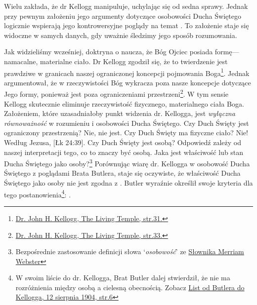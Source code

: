 Wielu zakłada, że dr Kellogg manipuluje, uchylając się od sedna sprawy. Jednak przy pewnym założeniu jego argumenty dotyczące osobowości Ducha Świętego logicznie wspierają jego kontrowersyjne poglądy na temat . To założenie staje się widoczne w samych danych, gdy uważnie śledzimy jego sposób rozumowania.

Jak widzieliśmy wcześniej, doktryna o  naucza, że Bóg Ojciec posiada formę—namacalne, materialne ciało. Dr Kellogg zgodził się, że to twierdzenie jest prawdziwe w granicach naszej ograniczonej koncepcji pojmowania Boga\footnote{\href{https://archive.org/details/J.H.Kellogg.TheLivingTemple1903/page/n33/}{Dr. John H. Kellogg, The Living Temple, str.31.}}. Jednak argumentował, że w rzeczywistości Bóg wykracza poza nasze koncepcje dotyczące Jego formy, ponieważ jest poza ograniczeniami przestrzeni\footnote{\href{https://archive.org/details/J.H.Kellogg.TheLivingTemple1903/page/n33/}{Dr. John H. Kellogg, The Living Temple, str.33.}}. W tym sensie Kellogg skutecznie eliminuje rzeczywistość fizycznego, materialnego ciała Boga. Założeniem, które uzasadniałoby punkt widzenia dr. Kellogga, jest \textit{wyłączna równoważność} w rozumieniu  i osobowości Ducha Świętego. Czy Duch Święty jest ograniczony przestrzenią? Nie, nie jest. Czy Duch Święty ma fizyczne ciało? Nie! Według Jezusa, [Łk 24:39]. Czy Duch Święty jest osobą? Odpowiedź zależy od naszej interpretacji tego, co to znaczy być osobą. Jaka jest właściwość lub stan Ducha Świętego jako osoby?\footnote{Bezpośrednie zastosowanie definicji słowa ‘\textit{osobowość}’ ze \href{https://www.merriam-webster.com/dictionary/personality}{Słownika Merriam Webster}} Porównując wiarę dr. Kellogga w osobowość Ducha Świętego z poglądami Brata Butlera, staje się oczywiste, że właściwość Ducha Świętego jako osoby nie jest zgodna z . Butler wyraźnie określił swoje kryteria dla tego postanowienia\footnote{W swoim liście do dr. Kellogga, Brat Butler dalej stwierdził, że nie ma rozróżnienia między osobą a cielesną obecnością. Zobacz \href{https://c7da.us/egwdl/Butler\%20to\%20Kellogg\%20Aug121904.pdf}{List od Butlera do Kellogga, 12 sierpnia 1904, str.6}}: .

